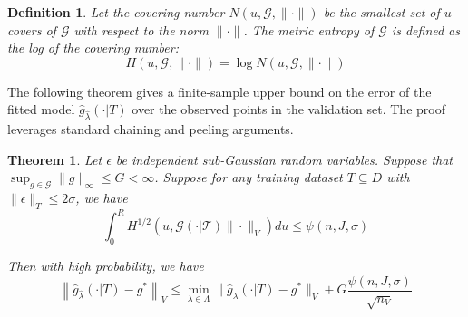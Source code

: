 \documentclass[12pt]{article}
\newtheorem{theorem}{Theorem}
\newtheorem{definition}{Definition}
\begin{document}
\begin{definition}
Let the covering number $N(u, \mathcal{G}, \| \cdot \|)$ be the smallest set of $u$-covers of $\mathcal{G}$ with respect to the norm $\| \cdot \|$. The metric entropy of $\mathcal{G}$ is defined as the log of the covering number:
\begin{equation}
H (u, \mathcal{G}, \| \cdot \| ) = \log N(u, \mathcal{G}, \| \cdot \|)
\end{equation}
\end{definition}

The following theorem gives a finite-sample upper bound on the error of the fitted model $\hat{g}_{\hat \lambda}(\cdot | T)$ over the observed points in the validation set. The proof leverages standard chaining and peeling arguments.

\begin{theorem}
\label{train_val_thrm}
Let $\epsilon$ be independent sub-Gaussian random variables. 
Suppose that $\sup_{g \in \mathcal{G}} \| g \|_\infty \le G < \infty$.
Suppose for any training dataset $T \subseteq D$ with $\| \epsilon \|_T \le 2 \sigma$, we have
\begin{equation}
\int_0^R H^{1/2} \left ( u, \mathcal{G(\cdot | T)} \| \cdot \|_V \right ) du \le \psi(n, J, \sigma)
\end{equation}

Then with high probability, we have
\begin{equation}
\label{error_bound}
\left \|\hat{g}_{\hat{\lambda} }(\cdot | T) - g^* \right \|_V
\le 
\min_{\lambda \in \Lambda}\| \hat{g}_{\lambda}(\cdot | T) - g^*\|_V
+ G \frac{\psi(n, J, \sigma)}{\sqrt{n_V}}
\end{equation}
\end{theorem}
\end{document}
